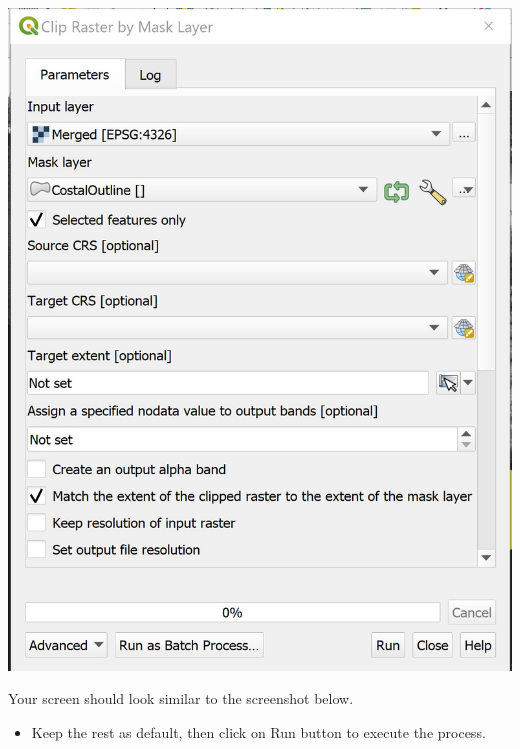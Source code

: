 \documentclass[
  letterpaper,
  DIV=11,
  numbers=noendperiod]{scrreprt}
\providecommand{\tightlist}{%
  \setlength{\itemsep}{0pt}\setlength{\parskip}{0pt}}\usepackage{longtable,booktabs,array}
\begin{document}
\includegraphics{./img06/image51.jpg}

Your screen should look similar to the screenshot below.

\begin{itemize}
\tightlist
\item
  Keep the rest as default, then click on Run button to execute the
  process.
\end{itemize}
\end{document}
